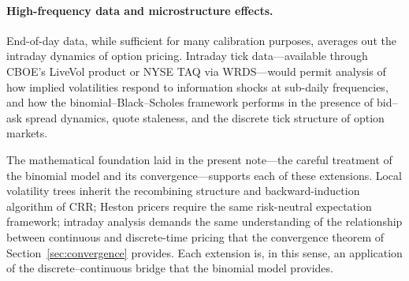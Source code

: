 \documentclass[11pt,a4paper]{article}
\theoremstyle{plain}
\theoremstyle{definition}
\begin{document}
\paragraph{High-frequency data and microstructure effects.} End-of-day data, while sufficient for many calibration purposes,
averages out the intraday dynamics of option pricing. Intraday tick data---available
through CBOE's LiveVol product or NYSE TAQ via WRDS---would permit
analysis of how implied volatilities respond to information shocks at
sub-daily frequencies, and how the binomial--Black--Scholes framework
performs in the presence of bid--ask spread dynamics, quote staleness,
and the discrete tick structure of option markets.

The mathematical foundation laid in the present note---the careful
treatment of the binomial model and its convergence---supports each of
these extensions. Local volatility trees inherit the recombining
structure and backward-induction algorithm of CRR; Heston pricers
require the same risk-neutral expectation framework; intraday analysis
demands the same understanding of the relationship between continuous
and discrete-time pricing that the convergence theorem of
Section~\ref{sec:convergence} provides. Each extension is, in this
sense, an application of the discrete--continuous bridge that the
binomial model provides. 


\nocite{*}
\end{document}
